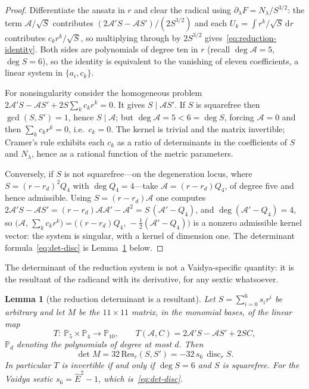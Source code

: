 \documentclass[12pt]{iopart}
\newcommand{\Ehat}{\hat E}
\newcommand{\dd}{\mathrm{d}}
\theoremstyle{plain}
\theoremstyle{definition}
\theoremstyle{plain}
\newtheorem{auxlemma}{Lemma}
\theoremstyle{remark}
\begin{document}
\begin{proof}
Differentiate the ansatz in $r$ and clear the radical using
$\partial_\lambda F=N_\lambda/S^{3/2}$: the term $\mathcal{A}/\sqrt S$ contributes
$(2\mathcal{A}'S-\mathcal{A}S')/(2S^{3/2})$ and each $U_k=\int r^k/\sqrt S\,\dd r$
contributes $c_k r^k/\sqrt S$, so multiplying through by $2S^{3/2}$
gives~\eqref{eq:reduction-identity}. Both sides are polynomials of degree ten in $r$
(recall $\deg\mathcal{A}=5$, $\deg S=6$), so the identity is equivalent to the vanishing
of eleven coefficients, a linear system in $\{a_i,c_k\}$.

For nonsingularity consider the homogeneous problem
$2\mathcal{A}'S-\mathcal{A}S'+2S\sum_k c_kr^k=0$. It gives $S\mid \mathcal{A}S'$. If $S$
is squarefree then $\gcd(S,S')=1$, hence $S\mid\mathcal{A}$; but
$\deg\mathcal{A}=5<6=\deg S$, forcing $\mathcal{A}=0$ and then $\sum_kc_kr^k=0$, i.e.\
$c_k=0$. The kernel is trivial and the matrix invertible; Cramer's rule exhibits each
$c_k$ as a ratio of determinants in the coefficients of $S$ and $N_\lambda$, hence as a
rational function of the metric parameters.

Conversely, if $S$ is not squarefree---on the degeneration locus, where
$S=(r-r_d)^2Q_4$ with $\deg Q_4=4$---take $\mathcal{A}=(r-r_d)Q_4$, of degree five and
hence admissible. Using $S=(r-r_d)\mathcal{A}$ one computes
$2\mathcal{A}'S-\mathcal{A}S'=(r-r_d)\mathcal{A}\mathcal{A}'-\mathcal{A}^2
=S\,(\mathcal{A}'-Q_4)$, and $\deg(\mathcal{A}'-Q_4)=4$, so
$\big(\mathcal{A},\,\sum_kc_kr^k\big)=\big((r-r_d)Q_4,\,-\tfrac12(\mathcal{A}'-Q_4)\big)$
is a nonzero admissible kernel vector: the system is singular, with a kernel of dimension
one. The determinant formula~\eqref{eq:det-disc} is Lemma~\ref{lem:det-res} below.
\end{proof}

The determinant of the reduction system is not a Vaidya-specific quantity: it is the
resultant of the radicand with its derivative, for any sextic whatsoever.

\begin{auxlemma}[the reduction determinant is a resultant]\label{lem:det-res}
Let $S=\sum_{i=0}^{6}s_ir^i$ be arbitrary and let $M$ be the $11\times11$ matrix, in the
monomial bases, of the linear map
\[
   T:\ \mathbb{P}_5\times\mathbb{P}_4\longrightarrow\mathbb{P}_{10},
   \qquad
   T(\mathcal{A},C)=2\mathcal{A}'S-\mathcal{A}S'+2SC ,
\]
$\mathbb{P}_d$ denoting the polynomials of degree at most $d$. Then
\begin{equation}
   \det M=32\,\mathrm{Res}_r(S,S')=-32\,s_6\,\operatorname{disc}_rS .
   \label{eq:det-res}
\end{equation}
In particular $T$ is invertible if and only if $\deg S=6$ and $S$ is squarefree. For the
Vaidya sextic $s_6=\Ehat^2-1$, which is~\eqref{eq:det-disc}.
\end{auxlemma}
\end{document}
